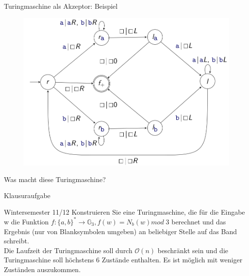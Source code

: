 \begin{frame}{Turingmaschine als Akzeptor: Beispiel}
    \begin{figure}
        \includegraphics[scale=0.3]{graphics/12/palindrom.png}
    \end{figure}
    Was macht diese Turingmaschine?
\end{frame}
\begin{frame}{Klausuraufgabe}
    \begin{block}{Wintersemester 11/12}
    	Konstruieren Sie eine Turingmaschine, die für die Eingabe w die Funktion
    	$f:\{a,b \}^* \rightarrow \mathbb{G}_3, f(w) = N_b(w)mod\; 3$ berechnet und das Ergebnis (nur von Blanksymbolen umgeben) an beliebiger Stelle auf das Band schreibt.\\
    	\vspace{10pt}
    	Die Laufzeit der Turingmaschine soll durch $\mathcal{O}(n)$ beschränkt sein und die Turingmaschine soll höchstens 6 Zustände enthalten. Es ist möglich mit weniger Zuständen auszukommen.
    \end{block}
\end{frame}


